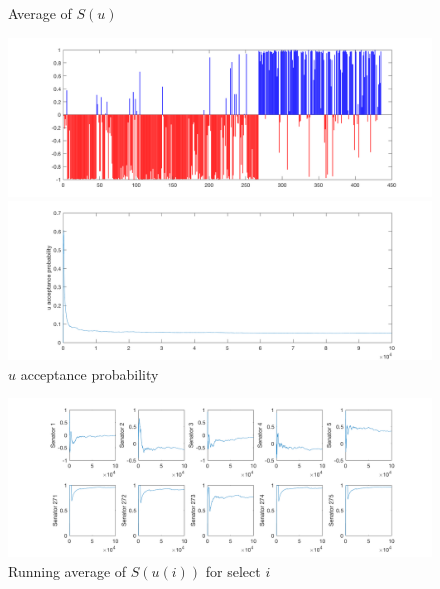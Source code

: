 \documentclass{siamart1116}
\begin{document}
\begin{figure}[!htb]
\begin{minipage}{0.48\textwidth}
    \centering
    \caption{\label{fig:voting_nonhier_u_avg} Average of $S(u)$}
    \includegraphics[width=\linewidth]{voting/nonhier/u_avg.png}
\end{minipage} \hfill
\begin{minipage}{0.48\textwidth}
    \centering
    \caption{\label{fig:voting_nonhier_u_accept} $u$ acceptance probability}
    \includegraphics[width=\linewidth]{voting/nonhier/u_accept.png}
\end{minipage}
\end{figure}

\begin{figure}[!htb]
\caption{\label{fig:voting_nonhier_senator_traces} Running average of $S(u(i))$ for select $i$}
\includegraphics[width=\linewidth]{voting/nonhier/senator_traces.png}
\end{figure}
\end{document}
